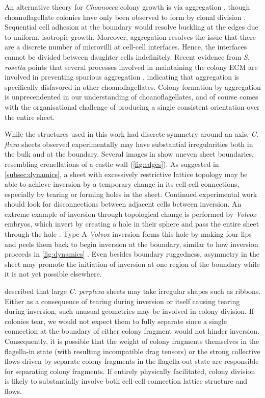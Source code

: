 An alternative theory for \textit{Choanoeca} colony growth is via aggregation \citep{grosberg2007}, though choanoflagellate colonies have only been observed to form by clonal division \citep{fairclough2010,alegado2012,woznica2016}.
Sequential cell adhesion at the boundary would resolve buckling at the edges due to uniform, isotropic growth.
Moreover, aggregation resolves the issue that there are a discrete number of microvilli at cell-cell interfaces.
Hence, the interfaces cannot be divided between daughter cells indefinitely.
Recent evidence from \textit{S. rosetta} points that several processes involved in maintaining the colony ECM are involved in preventing spurious aggregation \citep{wetzel2018}, indicating that aggregation is specifically disfavored in other choanoflagellates.
Colony formation by aggregation is unprecendented in our understanding of choanoflagellates, and of course comes with the organisational challenge of producing a single consistent orientation over the entire sheet.

While the structures used in this work had discrete symmetry around an axis, \textit{C. flexa} sheets observed experimentally may have substantial irregularities both in the bulk and at the boundary. 
Several images in \citet{brunet2019} show uneven sheet boundaries, resembling crenellations of a castle wall (\cref{fig:edges}).
As suggested in \cref{subsec:dynamics}, a sheet with excessively restrictive lattice topology may be able to achieve inversion by a temporary change in its cell-cell connections, especially by tearing or forming holes in the sheet.
Continued experimental work should look for disconnections between adjacent cells between inversion.
An extreme example of inversion through topological change is performed by \textit{Volvox} embryos, which invert by creating a hole in their sphere and pass the entire sheet through the hole \citep{hohn2015}.
Type-A \textit{Volvox} inversion forms this hole by making four lips and peels them back to begin inversion at the boundary, similar to how inversion proceeds in \cref{fig:dynamics} \citep{viamontes1977}.
Even besides boundary ruggedness, asymmetry in the sheet may promote the initiation of inversion at one region of the boundary while it is not yet possible elsewhere.

\citet{leadbeater1983} described that large \textit{C. perplexa} sheets may take irregular shapes such as ribbons. 
Either as a consequence of tearing during inversion or itself causing tearing during inversion, such unusual geometries may be involved in colony division.
If colonies tear, we would not expect them to fully separate since a single connection at the boundary of either colony fragment would not hinder inversion. 
Consequently, it is possible that the weight of colony fragments themselves in the flagella-in state (with resulting incompatible drag tensors) or the strong collective flows driven by separate colony fragments in the flagella-out state are responsible for separating colony fragments.
If entirely physically facilitated, colony division is likely to substantially involve both cell-cell connection lattice structure and flows.


